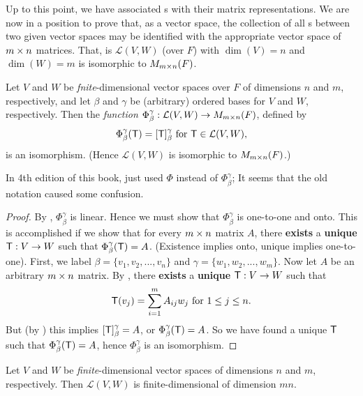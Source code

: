 Up to this point, we have associated \LTRAN{}s with their matrix representations.
We are now in a position to prove that, as a vector space, the collection of all \LTRAN{}s between two given vector
spaces may be identified with the appropriate vector space of \(m \times n\) matrices.
That, is \(\mathcal{L}(V, W)\) (over \(F\)) with \(\dim(V) = n\) and \(\dim(W) = m\) is isomorphic to \(M_{m \times n}(F)\).

\begin{theorem} \label{thm 2.20}
Let \(V\) and \(W\) be \emph{fnite}-dimensional vector spaces over \(F\) of dimensions \(n\) and \(m\), respectively,
and let \(\beta\) and \(\gamma\) be (arbitrary) ordered bases for \(V\) and \(W\), respectively.
Then the \emph{function} \(\Phi_{\beta}^{\gamma}: \mathcal{L}(V, W) \to M_{m \times n}(F)\), defined by
\[
    \Phi_{\beta}^{\gamma}(\textsf{T}) = [\textsf{T}]_{\beta}^{\gamma} \text{ for } \textsf{T} \in \mathcal{L}(V, W),
\]
is an isomorphism.
(Hence \(\mathcal{L}(V, W)\) is isomorphic to \(M_{m \times n}(F)\).)
\end{theorem}

\begin{note}
In 4th edition of this book,  just used \(\Phi\) instead of \(\Phi_{\beta}^{\gamma}\);
It seems that the old notation caused some confusion.
\end{note}

\begin{proof}
By , \(\Phi_{\beta}^{\gamma}\) is linear.
Hence we must show that \(\Phi_{\beta}^{\gamma}\) is one-to-one and onto.
This is accomplished if we show that for every \(m \times n\) matrix \(A\), there \textbf{exists} a \textbf{unique} \LTRAN{} \(\textsf{T} : V \to W\) such that \(\Phi_{\beta}^{\gamma}(\textsf{T}) = A\).
(Existence implies onto, unique implies one-to-one).
First, we label \(\beta = \{ v_1, v_2, ..., v_n \}\) and \(\gamma = \{ w_1, w_2, ..., w_m \}\).
Now let \(A\) be an arbitrary \(m \times n\) matrix.
By , there \textbf{exists} a \textbf{unique} \LTRAN{} \(\textsf{T}: V \to W\) such that
\[
    \textsf{T}(v_j) = \sum_{i = 1}^{m} A_{ij} w_j \text{ for } 1 \le j \le n.
\]
But (by ) this implies \([\textsf{T}]_{\beta}^{\gamma} = A\), or \(\Phi_{\beta}^{\gamma}(\textsf{T}) = A\).
So we have found a unique \(\textsf{T}\) such that \(\Phi_{\beta}^{\gamma}(\textsf{T}) = A\), hence \(\Phi_{\beta}^{\gamma}\) is an isomorphism.
\end{proof}

\begin{corollary} \label{corollary 2.20.1}
Let \(V\) and \(W\) be \emph{finite}-dimensional vector spaces of dimensions \(n\) and \(m\), respectively.
Then \(\mathcal{L}(V, W)\) is finite-dimensional of dimension \(mn\).
\end{corollary}

